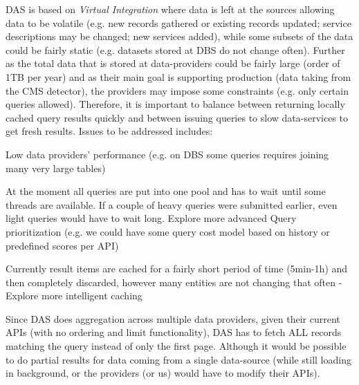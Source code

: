 \documentclass[a4paper,11pt,draft]{article}
\begin{document}
DAS is based on \textit{Virtual Integration} where data is left at the sources allowing data to be volatile (e.g. new records gathered or existing records updated; service descriptions may be changed; new services added), while some subsets of the data could be fairly static (e.g. datasets stored at DBS do not change often). 
%
Further as the total data that is stored at data-providers could be fairly large (order of 1TB per year) and as their main goal is supporting production (data taking from the CMS detector), the providers may impose some constraints (e.g. only certain queries allowed).
%
Therefore, it is important to balance between returning locally cached query results quickly   and between issuing queries to slow data-services to get fresh results.
%
Issues to be addressed includes:
\begin{compactitem}
						\item Low data providers' performance (e.g. on DBS some queries requires joining many very large tables)
	     				\item At the moment all queries are put into one pool and has to wait until some threads are available. If a couple of heavy queries were submitted earlier, even light queries would have to wait long. Explore more advanced Query prioritization 
	     					(e.g. we could have some query cost model based on history or predefined scores per API)
	     					
                		\item Currently result items are cached for a fairly short period of time (5min-1h) and then completely discarded, however many entities are not changing that often - Explore more intelligent caching
	                	  
	                		

					\item Since DAS does aggregation across multiple data providers, given their current APIs (with no ordering and limit functionality), DAS has to fetch ALL records matching the query instead of only the first page. Although it would be possible to do partial results for data coming from a single data-source (while still loading in background, or the providers (or us) would have to modify their APIs).
					

\end{compactitem}
\end{document}
